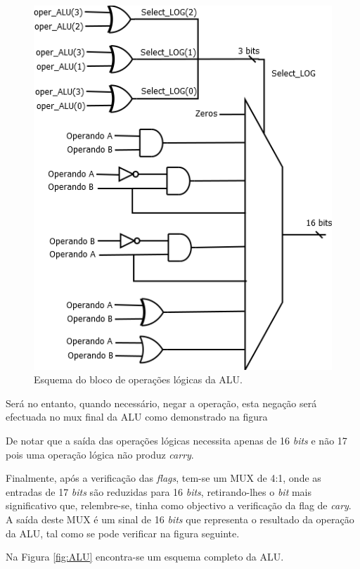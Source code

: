 \documentclass[11pt]{article}
\numberwithin{equation}{section}
\begin{document}
\vspace{1mm}

\begin{figure}[H]
	\centering
	\includegraphics[keepaspectratio=true, scale=0.55]{imagens/Log}
	\caption{Esquema do bloco de operações lógicas da ALU.}
	\vspace{-0.8em}
\end{figure}

Será no entanto, quando necessário, negar a operação, esta negação será efectuada no mux final da ALU como demonstrado na figura %

De notar que a saída das operações lógicas necessita apenas de 16 \textit{bits} e não 17 pois uma operação lógica não produz \textit{carry}.

Finalmente, após a verificação das \textit{flags}, tem-se um MUX de 4:1, onde as entradas de 17 \textit{bits} são reduzidas para 16 \textit{bits}, retirando-lhes o \textit{bit} mais significativo que, relembre-se, tinha como objectivo a verificação da flag de \textit{cary}. A saída deste MUX é um sinal de 16 \textit{bits} que representa o resultado da operação da ALU, tal como se pode verificar na figura seguinte.

Na Figura \ref{fig:ALU} encontra-se um esquema completo da ALU.
\end{document}
